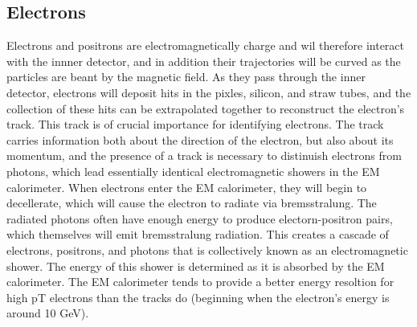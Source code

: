 


\subsection{Electrons}
Electrons and positrons are electromagnetically charge and wil therefore interact with the innner detector, and in addition their trajectories will be curved as the particles are beant by the magnetic field.
As they pass through the inner detector, electrons will deposit hits in the pixles, silicon, and straw tubes, and the collection of these hits can be extrapolated together to reconstruct the electron's track.
This track is of crucial importance for identifying electrons.
The track carries information both about the direction of the electron, but also about its momentum, and the presence of a track is necessary to distinuish electrons from photons, which lead essentially identical electromagnetic showers in the EM calorimeter.
When electrons enter the EM calorimeter, they will begin to decellerate, which will cause the electron to radiate via bremsstralung.
The radiated photons often have enough energy to produce electorn-positron pairs, which themselves will emit bremsstralung radiation.
This creates a cascade of electrons, positrons, and photons that is collectively known as an electromagnetic shower.
The energy of this shower is determined as it is absorbed by the EM calorimeter.
The EM calorimeter tends to provide a better energy resoltion for high pT electrons than the tracks do (beginning when the electron's energy is around 10 GeV).

